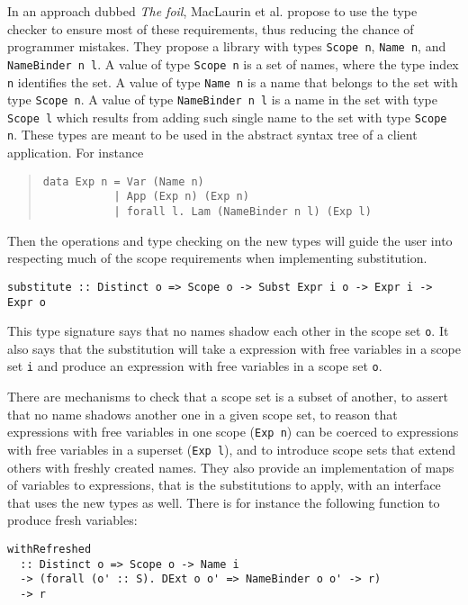 \documentclass[acmtog, anonymous]{acmart}
\newcommand{\tc}[1]{{\small\texttt{#1}}}
\begin{document}
In an approach dubbed \textit{The foil}, MacLaurin et al. propose to use the type
checker to ensure most of these
requirements, thus reducing the chance of programmer mistakes. They
propose a library with types \tc{Scope n}, \tc{Name n}, and
\tc{Name\-Binder n l}. A value of type \tc{Scope n} is a set of names, where
the type index \tc{n} identifies the set. A value of type \tc{Name n} is a name that
belongs to the set with type \tc{Scope n}. A value of type \tc{NameBinder n l} is
a name in the set with type \tc{Scope l} which results from adding such single
name to the set with type \tc{Scope n}. These types are meant to be used in
the abstract syntax tree of a client application. For instance

\begin{quotation}
\begin{verbatim}
data Exp n = Var (Name n)
           | App (Exp n) (Exp n)
           | forall l. Lam (NameBinder n l) (Exp l)
\end{verbatim}
\end{quotation}

Then the operations and type checking on the new types will guide the user into
respecting much of the scope requirements when implementing substitution.

\begin{verbatim}
substitute :: Distinct o => Scope o -> Subst Expr i o -> Expr i -> Expr o
\end{verbatim}

This type signature says that no names shadow each other in the scope set \tc{o}.
It also says that the substitution will take a expression with free variables in
a scope set \tc{i} and produce an expression with free variables in a scope set
\tc{o}.

There
are mechanisms to check that a scope set is a subset of another, to assert that no
name shadows another one in a given scope set, to reason that expressions
with free variables in one scope (\tc{Exp n}) can be coerced to expressions with
free variables in a superset (\tc{Exp l}), and to introduce scope sets that extend
others with freshly created names. They also provide an implementation of maps of
variables to expressions, that is the substitutions to apply, with an interface
that uses the new types as well. There is for instance the following function to
produce fresh variables:

\begin{verbatim}
withRefreshed
  :: Distinct o => Scope o -> Name i
  -> (forall (o' :: S). DExt o o' => NameBinder o o' -> r)
  -> r
\end{verbatim}
\end{document}
